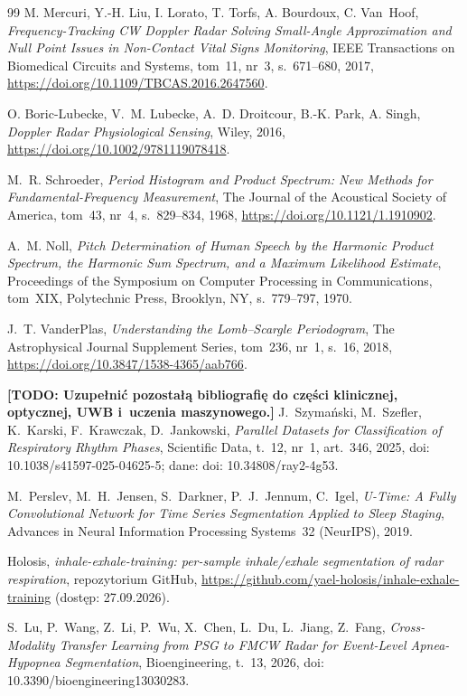 \documentclass[12pt,a4paper,oneside]{report}
\newcommand{\todo}[1]{\textcolor{red!75!black}{\textbf{[TODO: #1]}}}
\begin{document}
\begin{thebibliography}{99}
M. Mercuri, Y.-H. Liu, I. Lorato, T. Torfs, A. Bourdoux, C. Van~Hoof,
\emph{Frequency-Tracking CW Doppler Radar Solving Small-Angle Approximation
and Null Point Issues in Non-Contact Vital Signs Monitoring}, IEEE
Transactions on Biomedical Circuits and Systems, tom~11, nr~3, s.~671--680,
2017, \url{https://doi.org/10.1109/TBCAS.2016.2647560}.

O. Boric-Lubecke, V.~M. Lubecke, A.~D. Droitcour, B.-K. Park, A. Singh,
\emph{Doppler Radar Physiological Sensing}, Wiley, 2016,
\url{https://doi.org/10.1002/9781119078418}.

M.~R. Schroeder, \emph{Period Histogram and Product Spectrum: New Methods for
Fundamental-Frequency Measurement}, The Journal of the Acoustical Society of
America, tom~43, nr~4, s.~829--834, 1968,
\url{https://doi.org/10.1121/1.1910902}.

A.~M. Noll, \emph{Pitch Determination of Human Speech by the Harmonic Product
Spectrum, the Harmonic Sum Spectrum, and a Maximum Likelihood Estimate},
Proceedings of the Symposium on Computer Processing in Communications,
tom~XIX, Polytechnic Press, Brooklyn, NY, s.~779--797, 1970.

J.~T. VanderPlas, \emph{Understanding the Lomb--Scargle Periodogram}, The
Astrophysical Journal Supplement Series, tom~236, nr~1, s.~16, 2018,
\url{https://doi.org/10.3847/1538-4365/aab766}.

\todo{Uzupełnić pozostałą bibliografię do części klinicznej, optycznej,
UWB i~uczenia maszynowego.}
J.~Szymański, M.~Szefler, K.~Karski, F.~Krawczak, D.~Jankowski,
\emph{Parallel Datasets for Classification of Respiratory Rhythm Phases},
Scientific Data, t.~12, nr~1, art.~346, 2025,
doi: 10.1038/s41597-025-04625-5; dane: doi: 10.34808/ray2-4g53.

M.~Perslev, M.~H.~Jensen, S.~Darkner, P.~J.~Jennum, C.~Igel,
\emph{U-Time: A Fully Convolutional Network for Time Series Segmentation
Applied to Sleep Staging}, Advances in Neural Information Processing
Systems~32 (NeurIPS), 2019.

Holosis, \emph{inhale-exhale-training: per-sample inhale/exhale
segmentation of radar respiration}, repozytorium GitHub,
\url{https://github.com/yael-holosis/inhale-exhale-training}
(dostęp: 27.09.2026).

S.~Lu, P.~Wang, Z.~Li, P.~Wu, X.~Chen, L.~Du, L.~Jiang, Z.~Fang,
\emph{Cross-Modality Transfer Learning from PSG to FMCW Radar for
Event-Level Apnea-Hypopnea Segmentation}, Bioengineering, t.~13, 2026,
doi: 10.3390/bioengineering13030283.


\end{thebibliography}
\end{document}
